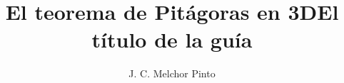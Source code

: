 \documentclass[12pt,addpoints,answers]{guia}
\title{El teorema de Pitágoras en 3D}
\title{El título de la guía}
\author{J. C. Melchor Pinto}
\begin{document}
\pagestyle{headandfoot}

\INFO
\printanswers
\vspace{-0.5cm}
\begin{multicols}{2}
    
    
    \columnbreak
    
\end{multicols}
\begin{questions}
    \questionboxed[10]{}
    \questionboxed[10]{}
    \questionboxed[10]{}
    \questionboxed[10]{}
    \questionboxed[10]{}
    \questionboxed[10]{}
    \questionboxed[10]{}
    \questionboxed[10]{}
    \questionboxed[10]{}
    \questionboxed[10]{}
\end{questions}
\end{document}
